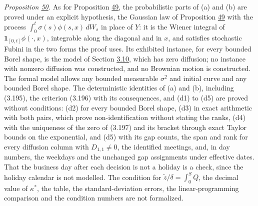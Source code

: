 \documentclass[11pt]{article}
\begin{document}
\emph{Proposition \hyperref[res:Proposition-50]{50}.} As for Proposition \hyperref[res:Proposition-49]{49}, the probabilistic parts of (a) and (b) are proved under an explicit hypothesis, the Gaussian law of Proposition \hyperref[res:Proposition-49]{49} with the process \(\int_0^t\sigma(s)\phi(s,x)\,dW_s\) in place of \(Y\): it is the Wiener integral of \(\mathbf 1_{[0,t]}\phi(\cdot,x)\), integrable along the diagonal and in \(x\), and satisfies stochastic Fubini in the two forms the proof uses. Its exhibited instance, for every bounded Borel shape, is the model of Section \hyperref[sec:3.10]{3.10}, which has zero diffusion; no instance with nonzero diffusion was constructed, and no Brownian motion is constructed. The formal model allows any bounded measurable \(\sigma^2\) and initial curve and any bounded Borel shape. The deterministic identities of (a) and (b), including (3.195), the criterion (3.196) with its consequences, and (d1) to (d5) are proved without conditions: (d2) for every bounded Borel shape, (d3) in exact arithmetic with both pairs, which prove non-identification without stating the ranks, (d4) with the uniqueness of the zero of (3.197) and its bracket through exact Taylor bounds on the exponential, and (d5) with its gap counts, the span and rank for every diffusion column with \(D_{1,1}\neq0\), the identified meetings, and, in day numbers, the weekdays and the unchanged gap assignments under effective dates. That the business day after each decision is not a holiday is a check, since the holiday calendar is not modelled. The condition for \(\tilde z/\delta=\int_0^SQ\), the decimal value of \(\kappa^*\), the table, the standard-deviation errors, the linear-programming comparison and the condition numbers are not formalized.
\end{document}
